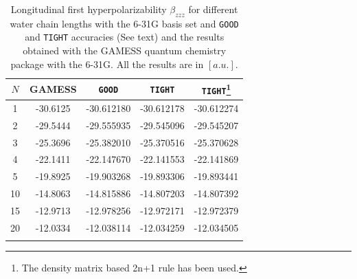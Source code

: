 \documentclass[prl,aps,twocolumn,showpacs,twocolumngrid,superbib]{revtex4}
\begin{document}
\begin{table}
  \centering
  \caption{\protect
    Longitudinal first hyperpolarizability $\beta_{zzz}$
    for different water chain lengths with the 6-31G basis set
    and {\tt GOOD} and {\tt TIGHT} accuracies (See text) and the results obtained with
    the GAMESS quantum chemistry package \cite{gamess} with the 6-31G. 
    All the results are in $[a.u.]$.
  }\label{tab:Beta_1D_Values}
  \begin{tabular}{ccccc}
    \toprule
    $N$ &\multicolumn{1}{c}{{\sc GAMESS}}
    &\multicolumn{1}{c}{{\tt GOOD}}
    &\multicolumn{1}{c}{{\tt TIGHT}}
    &\multicolumn{1}{c}{{\tt TIGHT}\footnote[1]{The density matrix based 2n+1 rule has been used.}} \\
    \hline
     1 & -30.6125 & -30.612180 & -30.612178 & -30.612274  \\
     2 & -29.5444 & -29.555935 & -29.545096 & -29.545207  \\
     3 & -25.3696 & -25.382010 & -25.370516 & -25.370628  \\
     4 & -22.1411 & -22.147670 & -22.141553 & -22.141869  \\
     5 & -19.8925 & -19.903268 & -19.893306 & -19.893441  \\
    10 & -14.8063 & -14.815886 & -14.807203 & -14.807392  \\
    15 & -12.9713 & -12.978256 & -12.972171 & -12.972379  \\
    20 & -12.0334 & -12.038114 & -12.034259 & -12.034505  \\
    \botrule
  \end{tabular}
\end{table}
\end{document}
